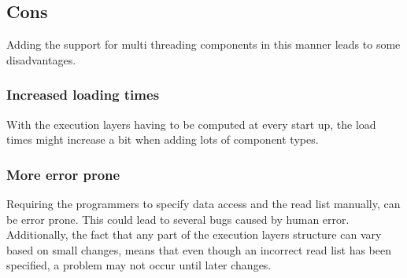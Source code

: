 \subsection{Cons}
Adding the support for multi threading components in this manner leads to some disadvantages.

\subsubsection{Increased loading times}
With the execution layers having to be computed at every start up, the load times might increase a bit when adding lots of component types.

\subsubsection{More error prone}
Requiring the programmers to specify data access and the read list manually, can be error prone. This could lead to several bugs caused by human error.
Additionally, the fact that any part of the execution layers structure can vary based on small changes, means that even though an incorrect read list has been specified, a problem may not occur until later changes.
